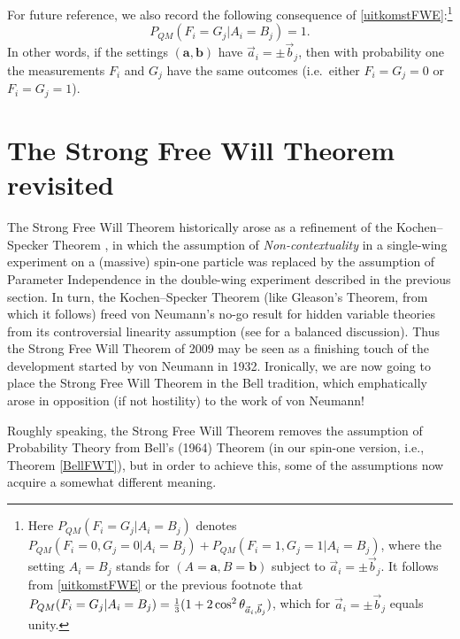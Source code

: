 \documentclass[11pt]{article}
\newcommand{\third}{\mbox{\footnotesize $\frac{1}{3}$}}
\newcommand{\er}{\eqref}
\newcommand{\ba}{\mathbf{a}}\newcommand{\bb}{\mathbf{b}}
\begin{document}
 For future reference, we also record the following consequence of \er{uitkomstFWE}:\footnote{Here $P_{QM}(F_i=G_j|A_i=B_j)$ denotes $P_{QM}(F_i=0,G_j=0|A_i=B_j)+P_{QM}(F_i=1,G_j=1|A_i=B_j)$, where the setting $A_i=B_j$ stands for $(A=\ba,B=\bb)$ subject to $\vec{a}_i=\pm\vec{b}_j$. It follows from \er{uitkomstFWE} or the previous footnote that $P_{QM}(F_i=G_j|A_i=B_j)=\third(1+2\cos^2 \theta_{\vec{a}_i,\vec{b}_j})$, which for $\vec{a}_i=\pm\vec{b}_j$ equals unity.}
\begin{equation}
P_{QM}(F_i=G_j|A_i=B_j)=1.\label{CKpc}
\end{equation}
In other words, if the settings $(\ba,\bb)$ have $\vec{a}_i=\pm\vec{b}_j$, then  with probability one the measurements $F_i$ and $G_j$ have the same outcomes (i.e.\ either $F_i=G_j=0$ or $F_i=G_j=1$).
\section{The Strong Free Will Theorem revisited}\label{FWTsec}
The Strong Free Will Theorem \cite{CK2} historically arose as a refinement of the Kochen--Specker Theorem \cite{Bell2,KS}, in which the assumption of \emph{Non-contextuality} in a single-wing experiment on a (massive) spin-one particle was replaced by the assumption of Parameter Independence in the double-wing experiment described in the previous section. In turn, the Kochen--Specker Theorem (like Gleason's Theorem, from which it follows) freed von Neumann's no-go result for hidden variable theories \cite{vN32} from its controversial linearity assumption (see \cite{Bub2} for a balanced discussion). Thus the Strong Free Will Theorem of 2009  may be seen as a finishing touch of the development started by von Neumann in 1932.
 Ironically, we are now going to place the  Strong Free Will Theorem in the Bell tradition, which emphatically arose in opposition (if not hostility) to the work of von Neumann! 
 
 Roughly speaking, the Strong Free Will Theorem removes the assumption of Probability Theory from Bell's (1964) Theorem (in our spin-one version, i.e., Theorem \ref{BellFWT}), but in order to achieve this, some of the assumptions now acquire a somewhat different meaning.
\end{document}
